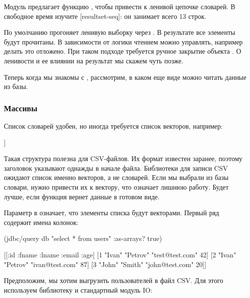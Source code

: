 Модуль  предлагает функцию , чтобы привести  к ленивой цепочке словарей. В свободное время изучите [resultset-seq]: он занимает всего 13 строк.

По умолчанию  прогоняет ленивую выборку через . В результате все элементы  будут прочитаны. В зависимости от логики чтением можно управлять, например делать это отложено. При таком подходе требуется ручное закрытие объекта . О ленивости и ее влиянии на результат мы скажем чуть позже.

Теперь когда мы знакомы с , рассмотрим, в каком еще виде можно читать данные из базы.

\subsubsection{Массивы}

Список словарей удобен, но иногда требуется список векторов, например:

\begin{english}
  \begin{clojure}
[[1 "Ivan" "Petrov" "test@test.com"]
 [2 "Ivan" "Petrov" "ivan@test.com"]
 [3 "John" "Smith" "john@test.com"]]
  \end{clojure}
\end{english}

Такая структура полезна для CSV-файлов. Их формат известен заранее, поэтому заголовок указывают однажды в начале файла. Библиотеки для записи CSV ожидают список именно векторов, а не словарей. Если мы выбрали из базы словари, нужно привести их к вектору, что означает лишнюю работу. Будет лучше, если функция  вернет данные в готовом виде.

Параметр  в  означает, что элементы списка будут векторами. Первый ряд содержит имена колонок:

\begin{english}
  \begin{clojure}
(jdbc/query db "select * from users" {:as-arrays? true})

[[:id :fname :lname :email :age]
 [1 "Ivan" "Petrov" "test@test.com" 42]
 [2 "Ivan" "Petrov" "ivan@test.com" 87]
 [3 "John" "Smith" "john@test.com" 20]]
  \end{clojure}
\end{english}

Предположим, мы хотим выгрузить пользователей в файл CSV. Для этого используем библиотеку  и стандартный модуль IO:

